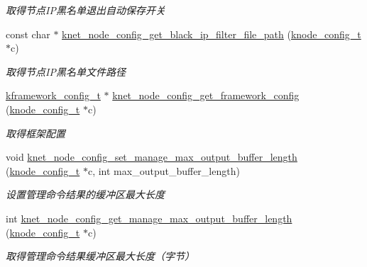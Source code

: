 \begin{DoxyCompactItemize}
\begin{DoxyCompactList}\small\item\em 取得节点\+I\+P黑名单退出自动保存开关 \end{DoxyCompactList}\item 
const char $\ast$ \hyperlink{a00104_a2f5df831f32251993337fb24e7e6224a_a2f5df831f32251993337fb24e7e6224a}{knet\+\_\+node\+\_\+config\+\_\+get\+\_\+black\+\_\+ip\+\_\+filter\+\_\+file\+\_\+path} (\hyperlink{a00066_af1cfaee0eb1c76ebf06076b95cc47ee1_af1cfaee0eb1c76ebf06076b95cc47ee1}{knode\+\_\+config\+\_\+t} $\ast$c)
\begin{DoxyCompactList}\small\item\em 取得节点\+I\+P黑名单文件路径 \end{DoxyCompactList}\item 
\hyperlink{a00066_adeaf952e0f0887507ff836385bf54874_adeaf952e0f0887507ff836385bf54874}{kframework\+\_\+config\+\_\+t} $\ast$ \hyperlink{a00104_ac4092c01406b24279e7d5bc897967a50_ac4092c01406b24279e7d5bc897967a50}{knet\+\_\+node\+\_\+config\+\_\+get\+\_\+framework\+\_\+config} (\hyperlink{a00066_af1cfaee0eb1c76ebf06076b95cc47ee1_af1cfaee0eb1c76ebf06076b95cc47ee1}{knode\+\_\+config\+\_\+t} $\ast$c)
\begin{DoxyCompactList}\small\item\em 取得框架配置 \end{DoxyCompactList}\item 
void \hyperlink{a00104_a8cd19de125fcb7ed101d29ef3a2835fd_a8cd19de125fcb7ed101d29ef3a2835fd}{knet\+\_\+node\+\_\+config\+\_\+set\+\_\+manage\+\_\+max\+\_\+output\+\_\+buffer\+\_\+length} (\hyperlink{a00066_af1cfaee0eb1c76ebf06076b95cc47ee1_af1cfaee0eb1c76ebf06076b95cc47ee1}{knode\+\_\+config\+\_\+t} $\ast$c, int max\+\_\+output\+\_\+buffer\+\_\+length)
\begin{DoxyCompactList}\small\item\em 设置管理命令结果的缓冲区最大长度 \end{DoxyCompactList}\item 
int \hyperlink{a00104_af8ceebe5e80524780731da25ff347431_af8ceebe5e80524780731da25ff347431}{knet\+\_\+node\+\_\+config\+\_\+get\+\_\+manage\+\_\+max\+\_\+output\+\_\+buffer\+\_\+length} (\hyperlink{a00066_af1cfaee0eb1c76ebf06076b95cc47ee1_af1cfaee0eb1c76ebf06076b95cc47ee1}{knode\+\_\+config\+\_\+t} $\ast$c)
\begin{DoxyCompactList}\small\item\em 取得管理命令结果缓冲区最大长度（字节） \end{DoxyCompactList}\item 

\end{DoxyCompactItemize}
